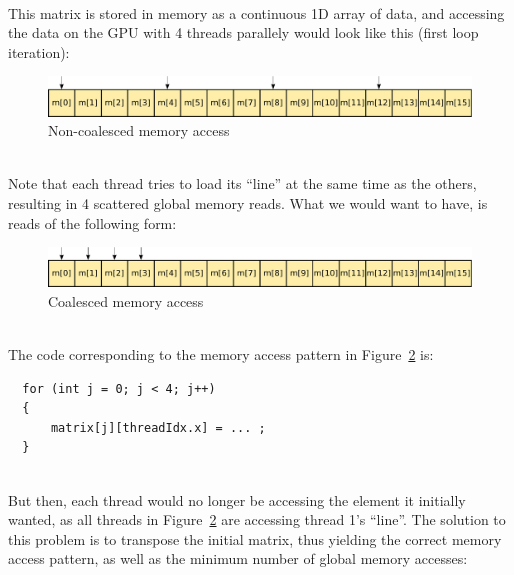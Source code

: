 \documentclass[10pt, a4paper]{report}
\begin{document}
\hspace{0pt} \\
This matrix is stored in memory as a continuous 1D array of data, and accessing
the data on the GPU with 4 threads parallely would look like this (first loop
iteration):

\begin{figure}[h]
\centering
\includegraphics[width=\linewidth]{figs/4x4_matrix_non_coalesced_memory_access}
\caption{Non-coalesced memory access}
\label{fig:4x4_matrix_non_coalesced_memory_access}
\end{figure}

\hspace{0pt} \\
Note that each thread tries to load its ``line'' at the same time as the others,
resulting in 4 scattered global memory reads.
What we would want to have, is reads of the following form:

\begin{figure}[h]
\centering
\includegraphics[width=\linewidth]{figs/4x4_matrix_coalesced_memory_access_no_transpose}
\caption{Coalesced memory access}
\label{fig:4x4_matrix_coalesced_memory_access_no_transpose}
\end{figure}

\hspace{0pt} \\
The code corresponding to the memory access pattern in
Figure~\ref{fig:4x4_matrix_coalesced_memory_access_no_transpose} is:

\begin{lstlisting}
  for (int j = 0; j < 4; j++)
  {
      matrix[j][threadIdx.x] = ... ;
  }
\end{lstlisting}

\hspace{0pt} \\
But then, each thread would no longer be accessing the element it initially
wanted, as all threads in
Figure~\ref{fig:4x4_matrix_coalesced_memory_access_no_transpose} are accessing
thread 1's ``line''.
The solution to this problem is to transpose the initial matrix, thus yielding
the correct memory access pattern, as well as the minimum number of global
memory accesses:
\end{document}
